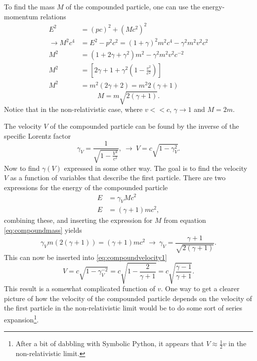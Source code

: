 \documentclass[11pt]{amsart}
\begin{document}
To find the mass $M$ of the compounded particle, one can use the energy-momentum relations
\begin{align*}
E^2 &= (pc)^2 + (Mc^2)^2 \\
\rightarrow M^2c^4 &= E^2 - p^2c^2 =(1+\gamma)^2m^2c^4 - \gamma^2m^2v^2c^2 \\
M^2 &= (1 + 2\gamma + \gamma^2)m^2 - \gamma^2m^2v^2c^{-2} \\
M^2 &= \left[2\gamma + 1 + \gamma^2\left(1-\frac{v^2}{c^2}\right) \right] \\
M^2 & = m^2 (2\gamma + 2) = m^2 2(\gamma + 1)
\end{align*}
\begin{equation}
\label{eq:compoundmass}
M = m \sqrt{2(\gamma + 1)}.
\end{equation}
Notice that in the non-relativistic case, where $v<<c$, $\gamma\to 1$ and $M = 2m$.

The velocity $V$ of the compounded particle can be found by the inverse of the specific Lorentz factor
\begin{equation}
\label{eq:compoundvelocity1}
\gamma_V = \frac{1}{\sqrt{1-\frac{V^2}{c^2}}},\ \rightarrow\ V = c\sqrt{1-\gamma_V^2}.
\end{equation}
Now to find $\gamma(V)$ expressed in some other way. The goal is to find the velocity $V$ as a function of variables that describe the first particle. There are two expressions for the energy of the compounded particle
\begin{align*}
E &= \gamma_V Mc^2 \\
E &= (\gamma + 1)mc^2,
\end{align*}
combining these, and inserting the expression for $M$ from equation \ref{eq:compoundmass} yields
\begin{equation}
\gamma_V m(2(\gamma + 1)) = (\gamma + 1)mc^2 \ \rightarrow \ \gamma_V = \frac{\gamma + 1}{\sqrt{2(\gamma + 1)}}.
\end{equation}
This can now be inserted into \ref{eq:compoundvelocity1}
\begin{equation}
V = c\sqrt{1-\gamma_V^{-2}} = c\sqrt{1-\frac{2}{\gamma+1}} = c\sqrt{\frac{\gamma -1}{\gamma + 1}}.
\end{equation}
This result is a somewhat complicated function of $v$. One way to get a clearer picture of how the velocity of the compounded particle depends on the velocity of the first particle  in the non-relativistic limit would be to do some sort of series expansion\footnote{After a bit of dabbling with Symbolic Python, it appears that $V\approx\frac{1}{2}v$ in the non-relativistic limit.}. 
\end{document}
